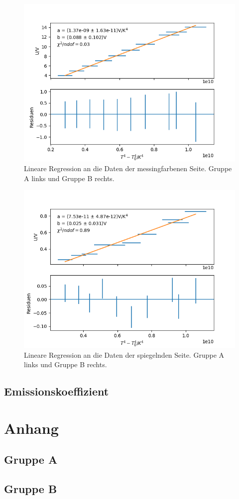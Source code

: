 \documentclass[12pt,a4paper]{article}
\begin{document}
\begin{figure}
\includegraphics[scale=0.5]{Bilder/Messing_A}
\caption{Lineare Regression an die Daten der messingfarbenen Seite. Gruppe A links und Gruppe B rechts.}
\label{fig:RegMessing}
\end{figure}

\begin{figure}
\includegraphics[scale=0.5]{Bilder/Spiegel_A}
\caption{Lineare Regression an die Daten der spiegelnden Seite. Gruppe A links und Gruppe B rechts.}
\label{fig:RegSpiegel}
\end{figure}


\subsection{Emissionskoeffizient}


\section{Anhang}
\subsection{Gruppe A}
\subsection{Gruppe B}
	
\end{document}
